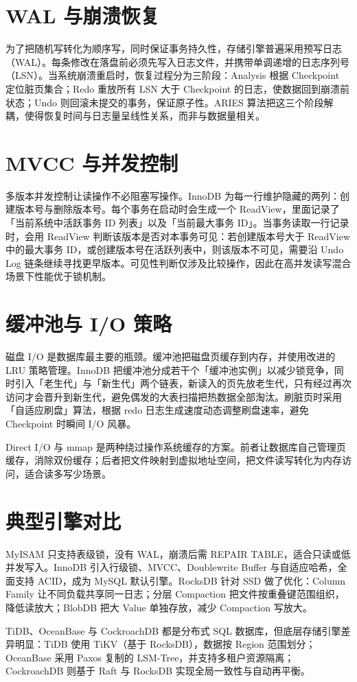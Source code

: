 \chapter{WAL 与崩溃恢复}
为了把随机写转化为顺序写，同时保证事务持久性，存储引擎普遍采用预写日志（WAL）。每条修改在落盘前必须先写入日志文件，并携带单调递增的日志序列号（LSN）。当系统崩溃重启时，恢复过程分为三阶段：Analysis 根据 Checkpoint 定位脏页集合；Redo 重放所有 LSN 大于 Checkpoint 的日志，使数据回到崩溃前状态；Undo 则回滚未提交的事务，保证原子性。ARIES 算法把这三个阶段解耦，使得恢复时间与日志量呈线性关系，而非与数据量相关。\par
\chapter{MVCC 与并发控制}
多版本并发控制让读操作不必阻塞写操作。InnoDB 为每一行维护隐藏的两列：创建版本号与删除版本号。每个事务在启动时会生成一个 ReadView，里面记录了「当前系统中活跃事务 ID 列表」以及「当前最大事务 ID」。当事务读取一行记录时，会用 ReadView 判断该版本是否对本事务可见：若创建版本号大于 ReadView 中的最大事务 ID，或创建版本号在活跃列表中，则该版本不可见，需要沿 Undo Log 链条继续寻找更早版本。可见性判断仅涉及比较操作，因此在高并发读写混合场景下性能优于锁机制。\par
\chapter{缓冲池与 I/O 策略}
磁盘 I/O 是数据库最主要的瓶颈。缓冲池把磁盘页缓存到内存，并使用改进的 LRU 策略管理。InnoDB 把缓冲池分成若干个「缓冲池实例」以减少锁竞争，同时引入「老生代」与「新生代」两个链表，新读入的页先放老生代，只有经过再次访问才会晋升到新生代，避免偶发的大表扫描把热数据全部淘汰。刷脏页时采用「自适应刷盘」算法，根据 redo 日志生成速度动态调整刷盘速率，避免 Checkpoint 时瞬间 I/O 风暴。\par
Direct I/O 与 mmap 是两种绕过操作系统缓存的方案。前者让数据库自己管理页缓存，消除双份缓存；后者把文件映射到虚拟地址空间，把文件读写转化为内存访问，适合读多写少场景。\par
\chapter{典型引擎对比}
MyISAM 只支持表级锁，没有 WAL，崩溃后需 REPAIR TABLE，适合只读或低并发写入。InnoDB 引入行级锁、MVCC、Doublewrite Buffer 与自适应哈希，全面支持 ACID，成为 MySQL 默认引擎。RocksDB 针对 SSD 做了优化：Column Family 让不同负载共享同一日志；分层 Compaction 把文件按重叠键范围组织，降低读放大；BlobDB 把大 Value 单独存放，减少 Compaction 写放大。\par
TiDB、OceanBase 与 CockroachDB 都是分布式 SQL 数据库，但底层存储引擎差异明显：TiDB 使用 TiKV（基于 RocksDB），数据按 Region 范围划分；OceanBase 采用 Paxos 复制的 LSM-Tree，并支持多租户资源隔离；CockroachDB 则基于 Raft 与 RocksDB 实现全局一致性与自动再平衡。\par
